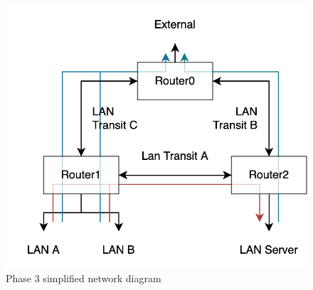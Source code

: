 \documentclass[11pt,a4paper]{report}
\begin{document}
    \begin{figure}[h]
        \centering
        \includegraphics[scale=0.40,valign=c]{diagramL250}
        \caption{Phase 3 simplified network diagram}
        \label{fig:p2netdiag}
    \end{figure}
\end{document}
